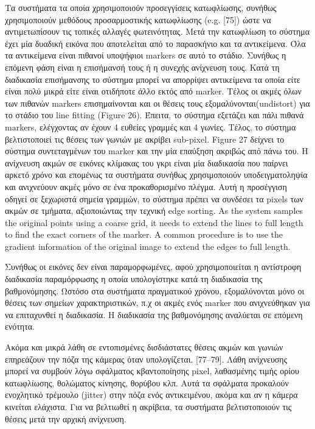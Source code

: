 \begin{itemize}
Τα συστήματα τα οποία χρησιμοποιούν προσεγγίσεις κατωφλίωσης, συνήθως χρησιμοποιούν μεθόδους προσαρμοστικής κατωφλίωσης (e.g. [75]) ώστε να αντιμετωπίσουν τις τοπικές αλλαγές φωτεινότητας. Μετά την κατωφλίωση το σύστημα έχει μία δυαδική εικόνα που αποτελείται από το παρασκήνιο και τα αντικείμενα. Όλα τα αντικείμενα είναι πιθανοί υποψήφιοι markers σε αυτό το στάδιο. Συνήθως η επόμενη φάση είναι η επισήμανσή τους ή η συνεχής ανίχνευση τους. Κατά τη διαδικασία επισήμανσης το σύστημα μπορεί να απορρίψει αντικείμενα τα οποία είτε είναι πολύ μικρά είτε είναι οτιδήποτε άλλο εκτός από marker. Τέλος οι ακμές όλων των πιθανών markers επισημαίνονται και οι θέσεις τους εξομαλύνονται(undistort) για το στάδιο του line fitting (Figure 26). Έπειτα, το σύστημα εξετάζει και πάλι πιθανά markers, ελέγχοντας αν έχουν 4 ευθείες γραμμές και 4 γωνίες. Τέλος, το σύστημα βελτιστοποιεί τις θέσεις των γωνιών με ακρίβει sub-pixel. Figure 27 δείχνει το σύστημα συντεταγμένων του marker και την μία επαύξηση ακριβώς από πάνω του.
Η ανίχνευση ακμών σε εικόνες κλίμακας του γκρι είναι μία διαδικασία που παίρνει αρκετό χρόνο και επομένως τα συστήματα συνήθως χρησιμοποιούν υποδειγματοληψία και ανιχνεύουν ακμές μόνο σε ένα προκαθορισμένο πλέγμα. Αυτή η προσέγγιση οδηγεί σε ξεχωριστά σημεία γραμμών, το σύστημα πρέπει να συνδέσει τα pixels των ακμών σε τμήματα, αξιοποιώντας την τεχνική edge sorting. As the system samples the
original points using a coarse grid, it needs to extend the lines to full length to find the exact corners of the marker. A common procedure is to use the gradient  information of the original image to extend the edges to full length.

Συνήθως οι εικόνες δεν είναι παραμορφωμένες, αφού χρησιμοποιείται η αντίστροφη διαδικασία παραμόρφωσης η οποία υπολογίστηκε κατά τη διαδικασία της βαθμονόμησης. Ωστόσο στα συστήματα πραγματικού χρόνου, εξομαλύνονται μόνο οι θέσεις των σημείων χαρακτηριστικών, π.χ οι ακμές ενός marker που ανιχνεύθηκαν για να επιταχυνθεί η διαδικασία. Η διαδικασία της βαθμονόμησης αναλύεται σε επόμενη ενότητα.

Ακόμα και μικρά λάθη σε εντοπισμένες δισδιάστατες θέσεις ακμών και γωνιών επηρεάζουν την πόζα της κάμερας όταν υπολογίζεται. [77–79]. Λάθη ανίχνευσης μπορεί να συμβούν λόγω σφάλματος κβαντοποίησης pixel, λαθασμένης τιμής ορίου κατωφλίωσης, θολώματος κίνησης, θορύβου κλπ. Αυτά τα σφάλματα προκαλούν ενοχλητικό τρέμουλο (jitter) στην πόζα ενός αντικειμένου, ακόμα και αν η κάμερα κινείται ελάχιστα. 
Για να βελτιωθεί η ακρίβεια, τα συστήματα βελτιστοποιούν τις θέσεις μετά την αρχική ανίχνευση.



\end{itemize}
